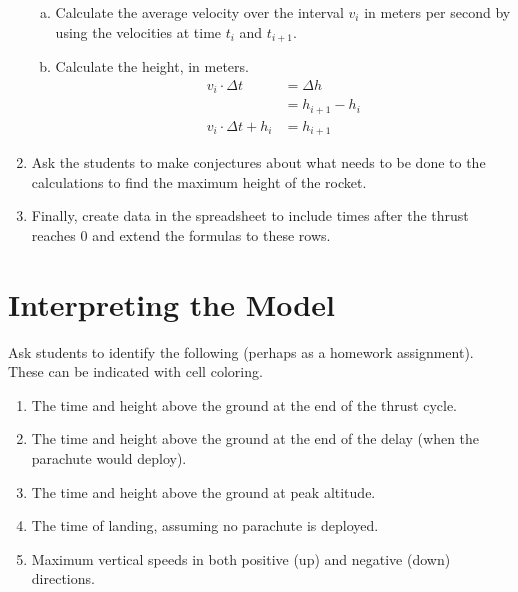 \documentclass [12pt, letterpaper, titlepage] {article}
\begin{document}
\begin{enumerate}
{		\begin{enumerate}[a.]
			\item{Calculate the average velocity over the interval $v_{i}$ in meters per second by using the velocities at time $t_i$ and $t_{i+1}$.}			
			\item{Calculate the height, in meters.
			\begin{align*}
			v_{i} \cdot \Delta t 		&= \Delta h \\
					 			&= h_{i+1}-h_i \\
			v_{i} \cdot \Delta t + h_i	&= h_{i+1}
			\end{align*}
			}
		\end{enumerate}	
	}
	\item{Ask the students to make conjectures about what needs to be done to the calculations to find the maximum height of the rocket.}
	\item{Finally, create data in the spreadsheet to include times after the thrust reaches 0 and extend the formulas to these rows.}
\end{enumerate}
\section*{Interpreting the Model}
Ask students to identify the following (perhaps as a homework assignment). These can be indicated with cell coloring. \begin{enumerate}
	\item{The time and height above the ground at the end of the thrust cycle.}
	\item{The time and height above the ground at the end of the delay (when the parachute would deploy).}
	\item{The time and height above the ground at peak altitude.}
	\item{The time of landing, assuming no parachute is deployed.}
	\item{Maximum vertical speeds in both positive (up) and negative (down) directions.}
\end{enumerate}
\end{document}
